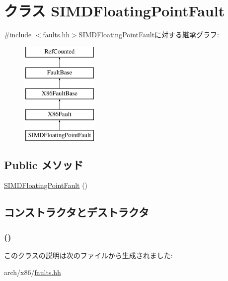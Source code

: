 \hypertarget{classX86ISA_1_1SIMDFloatingPointFault}{
\section{クラス SIMDFloatingPointFault}
\label{classX86ISA_1_1SIMDFloatingPointFault}
}


{\ttfamily \#include $<$faults.hh$>$}SIMDFloatingPointFaultに対する継承グラフ:\begin{figure}[H]
\begin{center}
\leavevmode
\includegraphics[height=5cm]{classX86ISA_1_1SIMDFloatingPointFault}
\end{center}
\end{figure}
\subsection*{Public メソッド}
\begin{DoxyCompactItemize}
\item 
\hyperlink{classX86ISA_1_1SIMDFloatingPointFault_affce6cd460bcad8f5fb28f51db30431f}{SIMDFloatingPointFault} ()
\end{DoxyCompactItemize}


\subsection{コンストラクタとデストラクタ}
\hypertarget{classX86ISA_1_1SIMDFloatingPointFault_affce6cd460bcad8f5fb28f51db30431f}{
\subsubsection[{SIMDFloatingPointFault}]{ ()}}
\label{classX86ISA_1_1SIMDFloatingPointFault_affce6cd460bcad8f5fb28f51db30431f}



\begin{DoxyCode}
367                                  :
368             X86Fault("SIMD Floating-Point", "#XF", 19)
369         {}
    };
\end{DoxyCode}


このクラスの説明は次のファイルから生成されました:\begin{DoxyCompactItemize}
\item 
arch/x86/\hyperlink{arch_2x86_2faults_8hh}{faults.hh}\end{DoxyCompactItemize}
